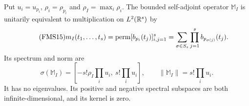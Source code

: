 \begin{theorem}\label{fms:fms:spectrum}
Put $u_i=u_{p_i}$, $\rho_i=\rho_{p_i}$ and
$\rho_I=\max_i\rho_i$.  The bounded self-adjoint operator
$\mathbb M_I$ is unitarily equivalent to multiplication on
$L^2(\mathbb R^s)$ by
\begin{equation}\tag{FMS15}\label{fms:fms:permanent}
 m_I(t_1,\ldots,t_s)=
 \operatorname{perm}[b_{p_i}(t_j)]_{i,j=1}^s
 =\sum_{\sigma\in S_s}\prod_{j=1}^s b_{p_{\sigma(j)}}(t_j).
\end{equation}
Its spectrum and norm are
\begin{equation}\tag{FMS16}\label{fms:fms:spectralinterval}
 \sigma(\mathbb M_I)=
 [-s!\rho_I\prod_i u_i,\ s!\prod_i u_i],
 \qquad \|\mathbb M_I\|=s!\prod_i u_i.
\end{equation}
It has no eigenvalues. Its positive and negative spectral subspaces
are both infinite-dimensional, and its kernel is zero.
\end{theorem}
